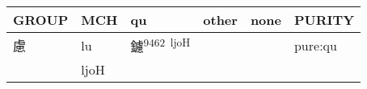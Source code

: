 \documentclass[14pt,a4paper]{scrartcl}
\begin{document}
\begin{longtable}[c]{@{}llllll@{}}
\toprule
\begin{minipage}[b]{0.14\columnwidth}\raggedright\strut
GROUP
\strut\end{minipage} &
\begin{minipage}[b]{0.14\columnwidth}\raggedright\strut
MCH
\strut\end{minipage} &
\begin{minipage}[b]{0.14\columnwidth}\raggedright\strut
qu
\strut\end{minipage} &
\begin{minipage}[b]{0.14\columnwidth}\raggedright\strut
other
\strut\end{minipage} &
\begin{minipage}[b]{0.14\columnwidth}\raggedright\strut
none
\strut\end{minipage} &
\begin{minipage}[b]{0.14\columnwidth}\raggedright\strut
PURITY
\strut\end{minipage}\tabularnewline
\midrule
\endhead
\begin{minipage}[t]{0.14\columnwidth}\raggedright\strut
慮
\strut\end{minipage} &
\begin{minipage}[t]{0.14\columnwidth}\raggedright\strut
lu
\strut\end{minipage} &
\begin{minipage}[t]{0.14\columnwidth}\raggedright\strut
鑢\textsuperscript{9462~ljoH}
\strut\end{minipage} &
\begin{minipage}[t]{0.14\columnwidth}\raggedright\strut
\strut\end{minipage} &
\begin{minipage}[t]{0.14\columnwidth}\raggedright\strut
\strut\end{minipage} &
\begin{minipage}[t]{0.14\columnwidth}\raggedright\strut
pure:qu
\strut\end{minipage}\tabularnewline
\begin{minipage}[t]{0.14\columnwidth}\raggedright\strut
𧆨
\strut\end{minipage} &
\begin{minipage}[t]{0.14\columnwidth}\raggedright\strut
ljoH
\strut\end{minipage} &
\begin{minipage}[t]{0.14\columnwidth}\raggedright\strut
\strut\end{minipage} &
\begin{minipage}[t]{0.14\columnwidth}\raggedright\strut

\end{minipage}
\end{longtable}
\end{document}
